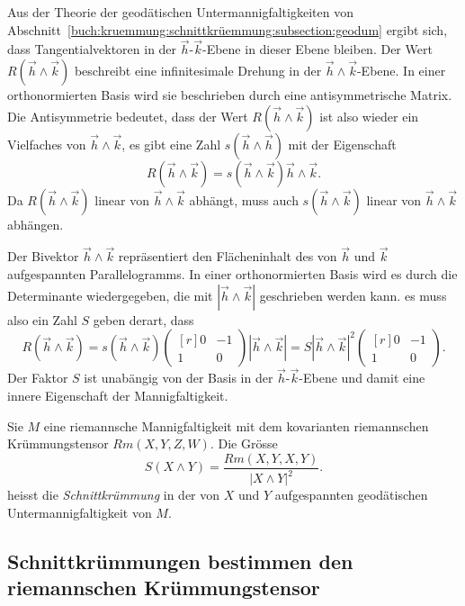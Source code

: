 Aus der Theorie der geodätischen Untermannigfaltigkeiten von
Abschnitt~\ref{buch:kruemmung:schnittkrüemmung:subsection:geodum}
ergibt sich, dass Tangentialvektoren in der $\vec{h}$-$\vec{k}$-Ebene
in dieser Ebene bleiben.
Der Wert $R(\vec{h}\wedge\vec{k})$ beschreibt eine infinitesimale Drehung
in der $\vec{h}\wedge\vec{k}$-Ebene.
In einer orthonormierten Basis wird sie beschrieben durch eine
antisymmetrische Matrix.
Die Antisymmetrie bedeutet, dass der Wert $R(\vec{h}\wedge\vec{k})$ ist
also wieder ein Vielfaches von $\vec{h}\wedge\vec{k}$, es gibt
eine Zahl $s(\vec{h}\wedge\vec{h})$ mit der Eigenschaft
\[
R(\vec{h}\wedge\vec{k})
=
s(\vec{h}\wedge\vec{k})
\vec{h}\wedge\vec{k}.
\]
Da $R(\vec{h}\wedge\vec{k})$ linear von $\vec{h}\wedge\vec{k}$ abhängt,
muss auch $s(\vec{h}\wedge\vec{k})$ linear von $\vec{h}\wedge\vec{k}$
abhängen.

Der Bivektor $\vec{h}\wedge\vec{k}$ repräsentiert den Flächeninhalt
des von $\vec{h}$ und $\vec{k}$ aufgespannten Parallelogramms. 
In einer orthonormierten Basis wird es durch die Determinante wiedergegeben,
die mit $|\vec{h}\wedge\vec{k}|$ geschrieben werden kann.
es muss also ein Zahl $S$ geben derart, dass
\[
R(\vec{h}\wedge\vec{k})
=
s(\vec{h}\wedge\vec{k})
\begin{pmatrix*}[r] 0&-1\\ 1&0\end{pmatrix*}
|\vec{h}\wedge\vec{k}|
=
S |\vec{h}\wedge\vec{k}|^2
\begin{pmatrix*}[r] 0&-1\\1&0\end{pmatrix*}.
\]
Der Faktor $S$ ist unabängig von der Basis in der $\vec{h}$-$\vec{k}$-Ebene
und damit eine innere Eigenschaft der Mannigfaltigkeit.

\begin{definition}[Schnittkrümmung]
\label{buch:kruemmung:schnittkruemmung:def:schnittkruemmung}
Sie $M$ eine riemannsche Mannigfaltigkeit mit dem kovarianten riemannschen
Krümmungstensor $Rm(X,Y,Z,W)$.
Die Grösse
\[
S(X\wedge Y) = \frac{Rm(X,Y,X,Y)}{|X\wedge Y|^2}.
\]
heisst die \emph{Schnittkrümmung} in der von $X$ und $Y$ aufgespannten
geodätischen Untermannigfaltigkeit von $M$.
%
\end{definition}


%
%
\subsection{Schnittkrümmungen bestimmen den riemannschen Krümmungstensor}

